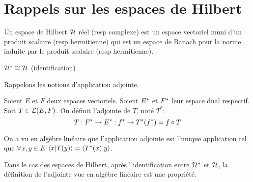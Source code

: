 \section{Rappels sur les espaces de Hilbert}

\begin{definition}
	Un espace de Hilbert $\mathcal{H}$ réel (resp complexe) est un espace vectoriel
	muni d'un produit scalaire (resp hermitienne) qui est un espace de Banach
	pour la norme induite par le produit scalaire (resp hermitienne).
\end{definition}

\begin{theorem}
	$\mathcal{H}^{*} \cong \mathcal{H}$ (identification)
	\label{thm:repr_riesz}
\end{theorem}

Rappelons les notions d'application adjointe.

\begin{definition}
	Soient $E$ et $F$ deux espaces vectoriels. Soient $E^{*}$ et
	$F^{*}$ leur espace dual respectif.
	Soit $T \in \mathcal{L}(E, F)$. On définit l'adjointe de $T$, noté
	$T^{*}$:
	\begin{equation}
		T : F^{*} \rightarrow E^{*} : f^{*} \rightarrow T^{*}(f^{*})
		= f \circ T
		\label{def:adjointe_operator}
	\end{equation}
\end{definition}

On a vu en algèbre linéaire que l'application adjointe est l'unique application
tel que $\forall x, y \in E$ $\bra{x}\ket{T(y)} = \bra{T^{*}(x)}\ket{y}$.

Dans le cas des espaces de Hilbert, après l'identification entre
$\mathcal{H}^{*}$ et $\mathcal{H}$, la définition de l'adjointe vue en algèbre
linéaire est une propriété.

